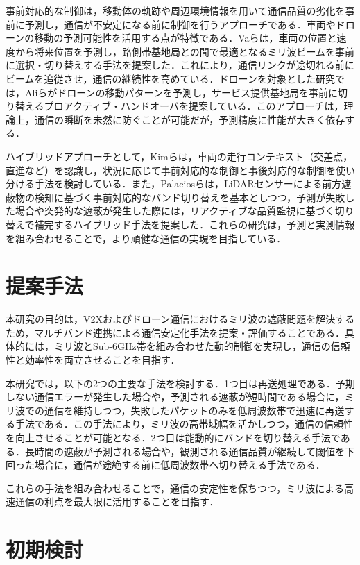 \documentclass[10pt, twocolumn, a4j, platex]{jsarticle}	%
\begin{document}
事前対応的な制御は，移動体の軌跡や周辺環境情報を用いて通信品質の劣化を事前に予測し，通信が不安定になる前に制御を行うアプローチである．車両やドローンの移動の予測可能性を活用する点が特徴である．Vaら\cite{0003}は，車両の位置と速度から将来位置を予測し，路側帯基地局との間で最適となるミリ波ビームを事前に選択・切り替えする手法を提案した．これにより，通信リンクが途切れる前にビームを追従させ，通信の継続性を高めている．ドローンを対象とした研究では，Aliら\cite{0004}がドローンの移動パターンを予測し，サービス提供基地局を事前に切り替えるプロアクティブ・ハンドオーバを提案している．このアプローチは，理論上，通信の瞬断を未然に防ぐことが可能だが，予測精度に性能が大きく依存する．

ハイブリッドアプローチとして，Kimら\cite{0005}は，車両の走行コンテキスト（交差点，直進など）を認識し，状況に応じて事前対応的な制御と事後対応的な制御を使い分ける手法を検討している．また，Palaciosら\cite{0006}は，LiDARセンサーによる前方遮蔽物の検知に基づく事前対応的なバンド切り替えを基本としつつ，予測が失敗した場合や突発的な遮蔽が発生した際には，リアクティブな品質監視に基づく切り替えで補完するハイブリッド手法を提案した．これらの研究は，予測と実測情報を組み合わせることで，より頑健な通信の実現を目指している．

\section{提案手法}

本研究の目的は，V2Xおよびドローン通信におけるミリ波の遮蔽問題を解決するため，マルチバンド連携による通信安定化手法を提案・評価することである．具体的には，ミリ波とSub-6GHz帯を組み合わせた動的制御を実現し，通信の信頼性と効率性を両立させることを目指す．

本研究では，以下の2つの主要な手法を検討する．1つ目は再送処理である．予期しない通信エラーが発生した場合や，予測される遮蔽が短時間である場合に，ミリ波での通信を維持しつつ，失敗したパケットのみを低周波数帯で迅速に再送する手法である．この手法により，ミリ波の高帯域幅を活かしつつ，通信の信頼性を向上させることが可能となる．2つ目は能動的にバンドを切り替える手法である．長時間の遮蔽が予測される場合や，観測される通信品質が継続して閾値を下回った場合に，通信が途絶する前に低周波数帯へ切り替える手法である．

これらの手法を組み合わせることで，通信の安定性を保ちつつ，ミリ波による高速通信の利点を最大限に活用することを目指す．

\section{初期検討}
\end{document}
